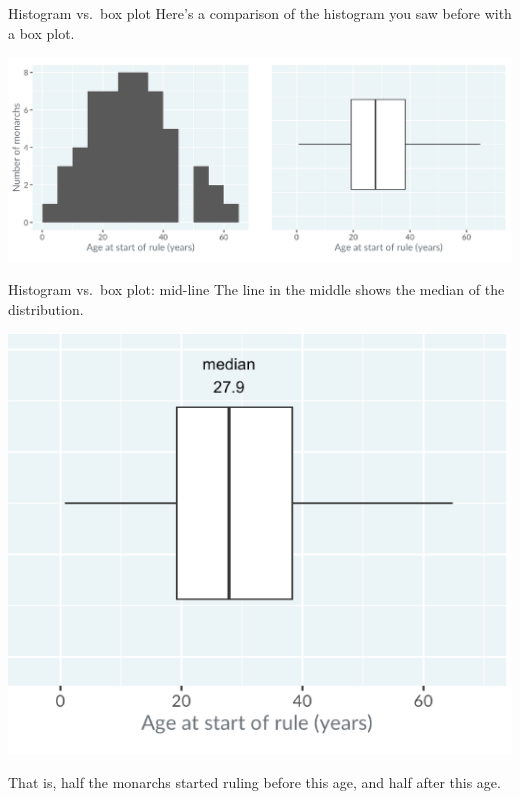 \documentclass[
  ignorenonframetext,
]{beamer}
\begin{document}
\begin{frame}{Histogram vs.~box plot}
\label{histogram-vs.-box-plot}
Here's a comparison of the histogram you saw before with a box plot.

\includegraphics{../images/im22.png}
\end{frame}

\begin{frame}{Histogram vs.~box plot: mid-line}
\label{histogram-vs.-box-plot-mid-line}
The line in the middle shows the median of the distribution.

\includegraphics{../images/im24.png}

That is, half the monarchs started ruling before this age, and half
after this age.
\end{frame}
\end{document}
